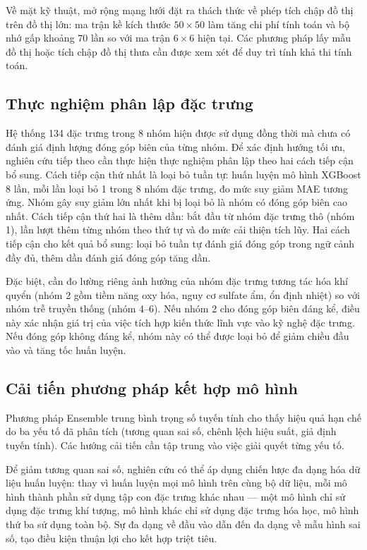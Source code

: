 Về mặt kỹ thuật, mở rộng mạng lưới đặt ra thách thức về phép tích chập đồ thị trên đồ thị lớn: ma trận kề kích thước $50 \times 50$ làm tăng chi phí tính toán và bộ nhớ gấp khoảng 70 lần so với ma trận $6 \times 6$ hiện tại. Các phương pháp lấy mẫu đồ thị  hoặc tích chập đồ thị thưa cần được xem xét để duy trì tính khả thi tính toán.

\subsection{Thực nghiệm phân lập đặc trưng}

Hệ thống 134 đặc trưng trong 8 nhóm hiện được sử dụng đồng thời mà chưa có đánh giá định lượng đóng góp biên của từng nhóm. Để xác định hướng tối ưu, nghiên cứu tiếp theo cần thực hiện thực nghiệm phân lập theo hai cách tiếp cận bổ sung. Cách tiếp cận thứ nhất là loại bỏ tuần tự: huấn luyện mô hình XGBoost 8 lần, mỗi lần loại bỏ 1 trong 8 nhóm đặc trưng, đo mức suy giảm MAE tương ứng. Nhóm gây suy giảm lớn nhất khi bị loại bỏ là nhóm có đóng góp biên cao nhất. Cách tiếp cận thứ hai là thêm dần: bắt đầu từ nhóm đặc trưng thô (nhóm 1), lần lượt thêm từng nhóm theo thứ tự và đo mức cải thiện tích lũy. Hai cách tiếp cận cho kết quả bổ sung: loại bỏ tuần tự đánh giá đóng góp trong ngữ cảnh đầy đủ, thêm dần đánh giá đóng góp tăng dần.

Đặc biệt, cần đo lường riêng ảnh hưởng của nhóm đặc trưng tương tác hóa khí quyển (nhóm 2 gồm tiềm năng oxy hóa, nguy cơ sulfate ẩm, ổn định nhiệt) so với nhóm trễ truyền thống (nhóm 4--6). Nếu nhóm 2 cho đóng góp biên đáng kể, điều này xác nhận giá trị của việc tích hợp kiến thức lĩnh vực vào kỹ nghệ đặc trưng. Nếu đóng góp không đáng kể, nhóm này có thể được loại bỏ để giảm chiều đầu vào và tăng tốc huấn luyện.

\subsection{Cải tiến phương pháp kết hợp mô hình}

Phương pháp Ensemble trung bình trọng số tuyến tính cho thấy hiệu quả hạn chế do ba yếu tố đã phân tích (tương quan sai số, chênh lệch hiệu suất, giả định tuyến tính). Các hướng cải tiến cần tập trung vào việc giải quyết từng yếu tố.

Để giảm tương quan sai số, nghiên cứu có thể áp dụng chiến lược đa dạng hóa dữ liệu huấn luyện: thay vì huấn luyện mọi mô hình trên cùng bộ dữ liệu, mỗi mô hình thành phần sử dụng tập con đặc trưng khác nhau --- một mô hình chỉ sử dụng đặc trưng khí tượng, mô hình khác chỉ sử dụng đặc trưng hóa học, mô hình thứ ba sử dụng toàn bộ. Sự đa dạng về đầu vào dẫn đến đa dạng về mẫu hình sai số, tạo điều kiện thuận lợi cho kết hợp triệt tiêu.

